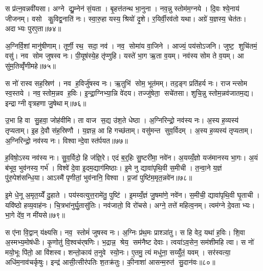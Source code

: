 स प्र॑त्न॒वन्नवी॑यसा। अग्ने द्यु॒म्नेन॑ सं॒यता। बृ॒हत्त॑तन्थ भा॒नुना। नव॒न्नु स्तोम॑म॒ग्नये। दि॒वः श्ये॒नाय॑ जीजनम्। वसो कु॒विद्व॒नाति॑ नः। स्वा॒रु॒हा यस्य॒ श्रियो॑ दृ॒शे। र॒यिर्वी॒रव॑तो यथा। अग्रे॑ य॒ज्ञस्य॒ चेत॑तः। अदाभ्यः पुरए॒ता॥७४॥

अ॒ग्निर्वि॒शां मानु॑षीणाम्। तूर्णी॒ रथ॒ सदा॒ नव॑। नव॒ सोमा॑य वा॒जिने। आज्यं॒ पय॑सोऽजनि। जुष्ट॒ शुचि॑तमं॒ वसु॑। नव सोम जुषस्व नः। पी॒यूष॑स्ये॒ह तृ॑प्णुहि। यस्ते॑ भा॒ग ऋ॒ता व॒यम्। नव॑स्य सोम ते व॒यम्। आ सु॑म॒तिव्वृँ॑णीमहे॥७५॥

स नो॑ रास्व सह॒स्रिण॑। नव ह॒विर्जु॑षस्व नः। ऋ॒तुभि॑ सोम॒ भूत॑मम्। तद॒ङ्ग प्रति॑हर्य नः। राजन्त्सोम स्व॒स्तये। नव॒स्तोम॒न्नव ह॒विः। इ॒न्द्रा॒ग्निभ्या॒न्नि वे॑दय। तज्जु॑षेता॒ सचे॑तसा। शुचि॒न्नु स्तोम॒न्नव॑जातम॒द्य। इन्द्राग्नी वृत्रहणा जु॒षेथाम्॥७६॥

उ॒भा हि वा सु॒हवा॒ जोह॑वीमि। ता वाज स॒द्य उ॑श॒ते धेष्ठा। अ॒ग्निरिन्द्रो॒ नव॑स्य नः। अ॒स्य ह॒व्यस्य॑ तृप्यताम्। इ॒ह दे॒वौ स॑ह॒स्रिणौ। य॒ज्ञन्न॒ आ हि गच्छ॑ताम्। वसु॑मन्त सुव॒र्विदम्। अ॒स्य ह॒व्यस्य॑ तृप्यताम्। अ॒ग्निरिन्द्रो॒ नव॑स्य नः। विश्वान्दे॒वास्त॑र्पयत॥७७॥

ह॒विषो॒ऽस्य नव॑स्य नः। सु॒व॒र्विदो॒ हि ज॑ज्ञि॒रे। एदं ब॒र्॒हिः सु॒ष्टरी॑मा॒ नवे॑न। अ॒यय्यँ॒ज्ञो यज॑मानस्य भा॒गः। अ॒यं ब॑भूव॒ भुव॑नस्य॒ गर्भ॑। विश्वे॑ दे॒वा इ॒दम॒द्याग॑मिष्ठाः। इ॒मे नु द्यावा॑पृथि॒वी स॒मीची। त॒न्वा॒ने य॒ज्ञं पु॑रु॒पेश॑सन्धि॒या। आऽस्मै॑ पृणीतां॒ भुव॑नानि॒ विश्वा। प्र॒जां पुष्टि॑म॒मृत॒न्नवे॑न॥७८॥

इ॒मे धे॒नू अ॒मृत॒य्येँ दु॒हाते। पय॑स्वत्युत्त॒रामे॑तु॒ पुष्टि॑। इ॒मय्यँ॒ज्ञं जु॒षमा॑णे॒ नवे॑न। स॒मीची॒ द्यावा॑पृथि॒वी घृ॒ताची। यवि॑ष्ठो हव्य॒वाह॑नः। चि॒त्रभा॑नुर्घु॒तासु॑तिः। नव॑जातो॒ वि रो॑चसे। अग्ने॒ तत्ते॑ महित्व॒नम्। त्वम॑ग्ने दे॒वताभ्यः। भा॒गे दे॑व॒ न मी॑यसे॥७९॥

स ए॑ना वि॒द्वान् य॑क्ष्यसि। नव॒ स्तोमं॑ जुषस्व नः। अ॒ग्निः प्र॑थ॒मः प्राश्ञा॑तु। स हि वेद॒ यथा॑ ह॒विः। शि॒वा अ॒स्मभ्य॒मोष॑धीः। कृ॒णोतु॑ वि॒श्वच॑र्‌षणिः। भ॒द्रान्न॒ श्रेय॒ सम॑नैष्ट देवाः। त्वया॑ऽव॒सेन॒ सम॑शीमहि त्वा। स नो॑ मयो॒भूः पि॑तो॒ आ वि॑शस्व। शन्तो॒काय॑ त॒नुवे स्यो॒नः। ए॒तमु॒ त्यं मधु॑ना॒ सय्युँ॑तं॒ यवम्। सर॑स्वत्या॒ अधि॑म॒नाव॑चर्कृषुः। इन्द्र॑ आसी॒त्सीर॑पतिः श॒तक्र॑तुः। की॒नाशा॑ आसन्म॒रुत॑ सु॒दान॑वः॥८०॥


